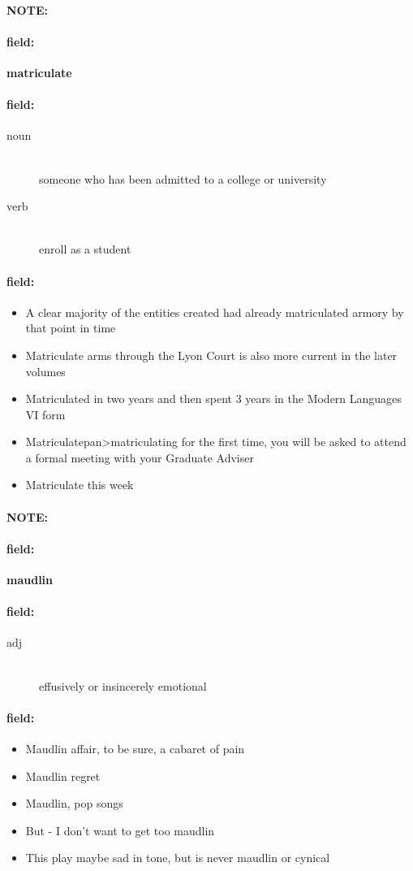 \documentclass[12pt]{article}
\newenvironment{note}{\paragraph{NOTE:}}{}
\newenvironment{field}{\paragraph{field:}}{}
\begin{document}
\begin{note}
\begin{field}
\textbf{\large matriculate}
\end{field}


\begin{field}
\begin{description}
\item[noun] \hfill \\ 
someone who has been admitted to a college or university

\item[verb] \hfill \\ 
enroll as a student

\end{description}
\end{field}

\begin{field}
\begin{itemize}
\item A clear majority of the entities created had already matriculated armory by that point in time
\item Matriculate arms through the Lyon Court is also more current in the later volumes
\item Matriculated in two years and then spent 3 years in the Modern Languages VI form
\item Matriculatepan>matriculating for the first time, you will be asked to attend a formal meeting with your Graduate Adviser
\item Matriculate this week
\end{itemize}
\end{field}
\end{note}
\begin{note}
\begin{field}
\textbf{\large maudlin}
\end{field}


\begin{field}
\begin{description}
\item[adj] \hfill \\ 
effusively or insincerely emotional

\end{description}
\end{field}

\begin{field}
\begin{itemize}
\item Maudlin affair, to be sure, a cabaret of pain
\item Maudlin regret
\item Maudlin, pop songs
\item But - I don't want to get too maudlin
\item This play maybe sad in tone, but is never maudlin or cynical
\end{itemize}
\end{field}
\end{note}
\end{document}
